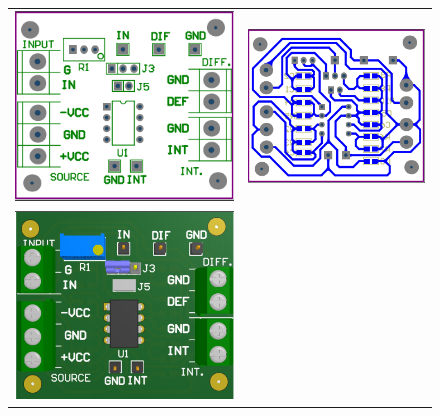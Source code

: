 \begin{figure}[H]
	\centering
	\begin{tabular}{c c}
		\includegraphics[scale=0.6]{Recursos/Altium/Placa_OVERLAY.png} &
		\includegraphics[scale=0.6]{Recursos/Altium/Placa_PCB.png} \\
		\includegraphics[scale=0.6]{Recursos/Altium/Placa_3D_OVERLAY.png} &

\end{tabular}
\end{figure}
